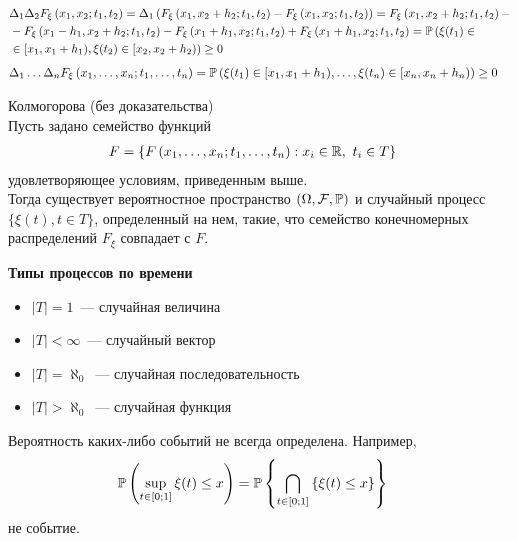 \begin{align*}
  & \Delta_1 \Delta_2 F_\xi \left( x_1,x_2; t_1,t_2\right) = \Delta_1\left( F_\xi \left( x_1,x_2+h_2; t_1,t_2\right) - F_\xi \left( x_1,x_2; t_1,t_2\right) \right) = F_\xi \left( x_1,x_2+h_2; t_1,t_2\right) - \\
  & - F_\xi \left( x_1-h_1,x_2+h_2; t_1,t_2\right) - F_\xi \left( x_1+h_1,x_2; t_1,t_2\right) + F_\xi \left( x_1+h_1,x_2; t_1,t_2\right) = \mathbb{P}\left( \xi(t_1)\in \right. \\
  & \left. \in[x_1, x_1+h_1), \xi(t_2) \in [x_2, x_2+h_2) \right) \geq 0
\end{align*}
\begin{align*}
  & \Delta_1 \dots \Delta_n F_\xi \left( x_1,\dots, x_n; t_1, \dots, t_n\right) = \mathbb{P}\left( \xi(t_1)\in [x_1, x_1+h_1), \dots, \xi(t_n) \in [x_n, x_n+h_n) \right) \geq 0
\end{align*}
\begin{theorem} Колмогорова (без доказательства)
    \\
    Пусть задано семейство функций
    \begin{align*}
      & F = \left\{ F \left( x_1,\dots, x_n; t_1, \dots, t_n\right): x_i \in \mathbb{R}, \ t_i \in T  \right\}
    \end{align*}
    удовлетворяющее условиям, приведенным выше.
    \\
    Тогда существует вероятностное пространство $(\Omega, \mathcal{F}, \mathbb{P})$ и случайный
    процесс $\{\xi(t), t \in T\}$, определенный на нем, такие, что семейство
    конечномерных распределений $F_\xi$ совпадает с $F$.
\end{theorem}
\textbf{Типы процессов по времени}
\begin{itemize}
    \item $\left| T \right| = 1$~--- случайная величина
    \item $\left| T \right| < \infty$~--- случайный вектор
    \item $\left| T \right| = \aleph_0$~--- случайная последовательность
    \item $\left| T \right| > \aleph_0$~--- случайная функция
\end{itemize}
\begin{example}
    Вероятность каких-либо событий не всегда определена. Например,
    \begin{align*}
      & \mathbb{P} \left( \sup_{t \in [0;1]} \xi(t) \leq x \right) = \mathbb{P}\left\{ \bigcap_{t \in [0;1]} \left\{ \xi(t) \leq x \right\} \right\}
    \end{align*}
    не событие.
\end{example}
